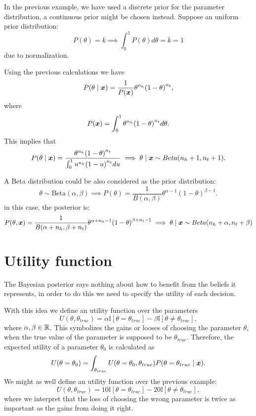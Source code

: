 In the previous example, we have used a discrete prior for the parameter distribution, a continuous prior might be chosen instead. Suppose an uniform prior distribution:
\[
P(\theta) = k \implies \int_0^1 P(\theta) d\theta = k = 1
\]
due to normalization.

Using the previous calculations we have
\[
  P(\theta \mid  \bm{x}) = \frac{1}{P(\bm{x})} \theta^{n_h}{(1-\theta)}^{n_t},
\]
where
\[
  P(\bm{x}) = \int_0^1 \theta^{n_h}{(1-\theta)}^{n_t} d\theta.
\]
This implies that
\[
  P(\theta \mid \bm{x}) = \frac{\theta^{n_h}{(1-\theta)}^{n_t} }{ \int_0^1 u^{n_h}{(1-u)}^{n_t} du} \implies \theta \mid \bm{x} \sim Beta(n_h + 1, n_t + 1).
\]

A Beta distribution could be also considered as the prior distribution:
\[
  \theta \sim \text{Beta}(\alpha, \beta) \implies P(\theta) = \frac{1}{B(\alpha, \beta)}\theta^{\alpha - 1}{(1 - \theta)}^{\beta - 1}.
\]
in this case, the posterior is:
\[
  P(\theta, \bm{x}) = \frac{1}{B(\alpha + n_h, \beta + n_t)}\theta^{\alpha
    + n_h - 1}{(1 - \theta)}^{\beta + n_t - 1} \implies \theta \mid \bm{x} \sim Beta(n_h + \alpha, n_t + \beta)
\]

\section{Utility function}

The Bayesian posterior says nothing about how to benefit from the beliefs it
represents, in order to do this we need to specify the utility of each decision.

With this idea we define an utility function over the parameters
\[
  U(\theta, \theta_{true}) = \alpha \mathbb{I}[\theta = \theta_{true}] - \beta
  \mathbb{I}[\theta \neq \theta_{true}],
\]
where \(\alpha, \beta \in \mathbb{R}\). This symbolizes the gains or looses of choosing
the parameter \(\theta\), when the true value of the parameter is supposed to be
\(\theta_{true}\). Therefore, the expected utility of a parameter \(\theta_0\) is
calculated as
\[
  U(\theta = \theta_0) = \int_{\theta_{true}}U(\theta = \theta_0,
  \theta_{true})P(\theta = \theta_{true}  \mid  \bm{x}).
\]
We might as well define an utility function over the previous example:
\[
  U(\theta, \theta_{true}) = 10\mathbb{I}[\theta = \theta_{true}] - 20
  \mathbb{I}[\theta \neq \theta_{true}],
\]
where we interpret that the loss of choosing the wrong parameter is twice as
important as the gains from doing it right.

